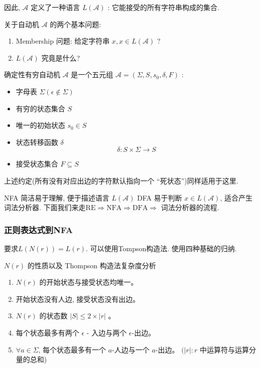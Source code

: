 \documentclass{ctexart}
\begin{document}
    因此, $\mathcal{A}$ 定义了一种语言 $L(\mathcal{A})$ : 它能接受的所有字符串构成的集合.

    关于自动机 $\mathcal{A}$ 的两个基本问题:
    \begin{enumerate}
        \item Membership 问题: 给定字符串 $x, x \in L(\mathcal{A})$ ?
        \item $L(\mathcal{A})$ 究竟是什么?
    \end{enumerate}

    \begin{definition}[DFA]
        确定性有穷自动机 $\mathcal{A}$ 是一个五元组 $\mathcal{A}=\left(\Sigma, S, s_0, \delta, F\right)$ :
        \begin{itemize}
            \item 字母表 $\Sigma(\epsilon \notin \Sigma)$
            \item 有穷的状态集合 $S$
            \item 唯一的初始状态 $s_0 \in S$
            \item 状态转移函数 $\delta$ 
            $$
            \delta: S \times \Sigma \rightarrow S
            $$
            \item 接受状态集合 $F \subseteq S$
        \end{itemize} 
        
    \end{definition}

    上述约定(所有没有对应出边的字符默认指向一个 “死状态”)同样适用于这里. 

    NFA 简洁易于理解, 便于描述语言 $L(\mathcal{A})$ DFA 易于判断 $x \in L(\mathcal{A})$, 适合产生词法分析器. 下面我们来走$\mathrm{RE} \Longrightarrow \mathrm{NFA} \Longrightarrow \mathrm{DFA} \Longrightarrow$ 词法分析器的流程. 

    \subsubsection{正则表达式到NFA}

    要求$L(N(r))=L(r)$. 可以使用Tompson构造法. 使用四种基础的归纳. 

        
    $N(r)$ 的性质以及 Thompson 构造法复杂度分析
\begin{enumerate}
    \item  $N(r)$ 的开始状态与接受状态均唯一。
    \item  开始状态没有人边, 接受状态没有出边。
    \item  $N(r)$ 的状态数 $|S| \leq 2 \times|r|$ 。
    \item  每个状态最多有两个 $\epsilon$ - 入边与两个 $\epsilon$-出边。
    \item  $\forall a \in \Sigma$, 每个状态最多有一个 $a$-人边与一个 $a$-出边。
    $(|r|: r$ 中运算符与运算分量的总和)
\end{enumerate}
\end{document}
